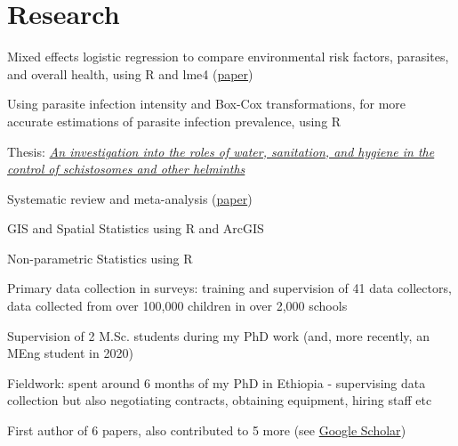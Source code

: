 \documentclass[]{cv-template}
\begin{document}
\begin{minipage}[t]{0.66\textwidth}

\section{Research}
\begin{tightemize}
\item Mixed effects logistic regression to compare environmental risk factors, parasites, and overall health, using R and lme4 (\href{https://journals.plos.org/plosntds/article?id=10.1371/journal.pntd.0005948}{paper})
\item Using parasite infection intensity and Box-Cox transformations, for more accurate estimations of parasite infection prevalence, using R
\end{tightemize}
\sectionsep


Thesis: {\href{https://spiral.imperial.ac.uk/handle/10044/1/44497}{\textit{An investigation into the roles of water, sanitation, and hygiene in the control of schistosomes and other helminths}}}
\begin{tightemize}
\item Systematic review and meta-analysis (\href{https://journals.plos.org/plosntds/article?id=10.1371/journal.pntd.0003296}{paper})
\item GIS and Spatial Statistics using R and ArcGIS
\item Non-parametric Statistics using R
\item Primary data collection in surveys: training and supervision of 41 data collectors, data collected from over 100,000 children in over 2,000 schools
\item Supervision of 2 M.Sc. students during my PhD work (and, more recently, an MEng student in 2020)
\item Fieldwork: spent around 6 months of my PhD in Ethiopia - supervising data collection but also negotiating contracts, obtaining equipment, hiring staff etc
\item First author of 6 papers, also contributed to 5 more (see \href{https://scholar.google.co.uk/citations?hl=en&user=HZLogpQAAAAJ}{Google Scholar})
\end{tightemize}
\sectionsep


\end{minipage}
\end{document}
